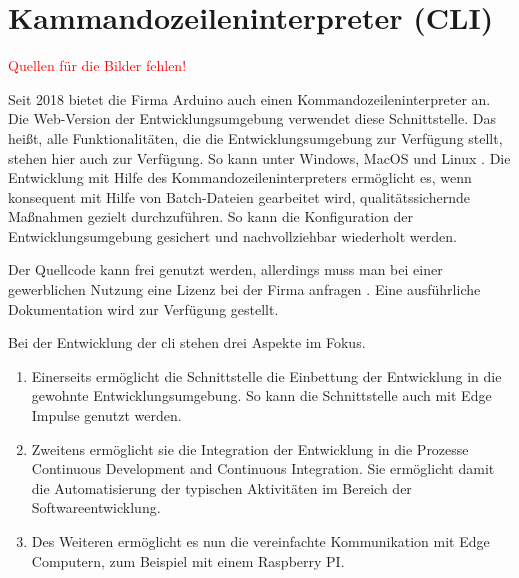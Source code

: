 %
%
%



\chapter{Kammandozeileninterpreter (CLI)}

\textcolor{red}{Quellen für die Bilder fehlen!}


Seit 2018 bietet die Firma Arduino auch einen Kommandozeileninterpreter an. \cite{ArduinoCLI:2018} Die Web-Version der Entwicklungsumgebung verwendet diese Schnittstelle. Das heißt, alle Funktionalitäten, die die Entwicklungsumgebung zur Verfügung stellt, stehen hier auch zur Verfügung. So kann unter Windows, MacOS und Linux \cite{ArduinoCLI:2022}. Die Entwicklung mit Hilfe des Kommandozeileninterpreters ermöglicht es, wenn konsequent mit Hilfe von Batch-Dateien gearbeitet wird, qualitätssichernde Maßnahmen gezielt durchzuführen. So kann die Konfiguration der Entwicklungsumgebung gesichert und nachvollziehbar wiederholt werden. 


Der Quellcode  kann frei genutzt werden, allerdings muss man bei einer gewerblichen Nutzung eine Lizenz bei der Firma anfragen \cite{ArduinoCLIGit:2022}. Eine ausführliche Dokumentation wird zur Verfügung gestellt. \cite{ArduinoCLIIntro:2020,ArduinoCLIDoc:2022}

Bei der Entwicklung der \ac{cli} stehen drei Aspekte im Fokus. 

\begin{enumerate}
  \item Einerseits ermöglicht die Schnittstelle die Einbettung der Entwicklung in die gewohnte Entwicklungsumgebung. So kann die Schnittstelle auch mit  Edge Impulse genutzt werden. 
  \item Zweitens ermöglicht sie die Integration der Entwicklung in die Prozesse Continuous Development and Continuous Integration. Sie ermöglicht damit die Automatisierung der typischen Aktivitäten im Bereich der Softwareentwicklung.
  \item  Des Weiteren ermöglicht es nun die vereinfachte Kommunikation mit Edge Computern, zum Beispiel mit einem Raspberry PI.
\end{enumerate}

